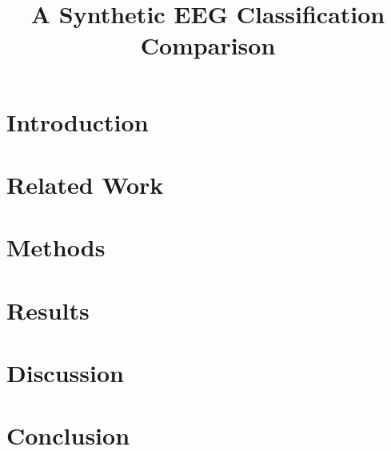 \documentclass[10pt]{article}
\title{A Synthetic EEG Classification Comparison}
\author{}
\date{}
\begin{document}
\maketitle
\begin{abstract}
\end{abstract}
\section{Introduction}
\section{Related Work}
\section{Methods}
\section{Results}
\section{Discussion}
\section{Conclusion}


\end{document}
